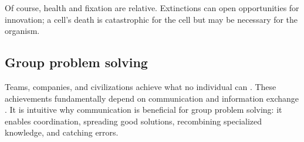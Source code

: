 \documentclass[11pt]{article}
\begin{document}
Of course, health and fixation are relative. Extinctions can open opportunities for innovation; a cell's death is catastrophic for the cell but may be necessary for the organism. 





\subsection*{Group problem solving}

Teams, companies, and civilizations achieve what no individual can \citep{henrich2016secret, hutchins1995cognition}. These achievements fundamentally depend on communication and information exchange \citep{sawyer2017group, mesmermagnus2009information}. It is intuitive why communication is beneficial for group problem solving: it enables coordination, spreading good solutions, recombining specialized knowledge, and catching errors. 
\end{document}
